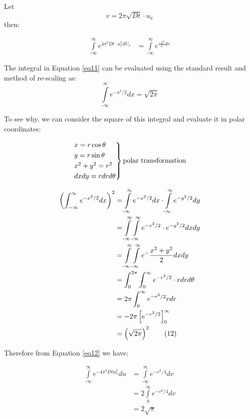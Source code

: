 Let $$ v =2\pi \sqrt{D t} \cdot u_x$$ then:

\begin{align*}
    \int\limits^{\infty}_{\text{-}\infty} e^{4 \pi^2 D t \cdot u_x^2 dU_x} &= \int\limits^{\infty}_{\text{-}\infty} e^{\frac{-v^2}{4}dv} \tag{11}
    \label{eq11}
\end{align*}

The integral in Equation \eqref{eq11} can be evaluated using the standard result and method of re-scaling as:
$$ \int\limits^{\infty}_{\text{-}\infty} e^{-x^2/2} dx = \sqrt{2\pi} $$

To see why, we can consider the square of this integral and evaluate it in polar coordinates: 

\begin{center}
\begin{equation*}
    \begin{rcases}
        $$x = r\cos \theta$$ \\
        $$y = r\sin \theta$$ \\
        $$x^2 + y^2 = r^2$$ \\
        $$dxdy = rdrd \theta$$\\
    \end{rcases}
    \text{polar transformation}  
\end{equation*}
\end{center}

\begin{align*}
\left(\int_{-\infty}^{\infty} e^{-x^2/2} dx\right)^2  &= \int\limits^{\infty}_{\text{-}\infty} e^{-x^2/2} dx \cdot \int\limits^{\infty}_{\text{-}\infty} e^{-y^2/2} dy \\
&= \int\limits^{\infty}_{\text{-}\infty}\int\limits^{\infty}_{\text{-}\infty} e^{-x^2/2} \cdot e^{-y^2/2} dx dy \\
&= \int\limits^{\infty}_{\text{-}\infty}\int\limits^{\infty}_{\text{-}\infty} e^-{\frac{x^2 + y^2}{2}} dx dy \\
&= \int_{0}^{2\pi} \int_{0}^{\infty} e^{-r^2/2} \cdot r dr d\theta \\
&= 2\pi \int_{0}^{\infty} e^{-r^2/2} r dr \\
&= -2\pi \left[e^{-r^2/2}\right]_{0}^{\infty} \\
&= \left(\sqrt{2\pi}\right)^2 \tag{12}
\label{eq12}
\end{align*}

Therefore from Equation \eqref{eq12} we have:

\begin{align*}
\int\limits^{\infty}_{\text{-}\infty} e^{-4 \pi^2 D t u_x^2} du &= \int\limits^{\infty}_{\text{-}\infty} e^{-v^2/4} dv \\
&= 2 \int\limits^{\infty}_{0} e^{-v^2/4} dv  \\
&= 2\sqrt{\pi} \tag{13}
\label{eq13}
\end{align*}

